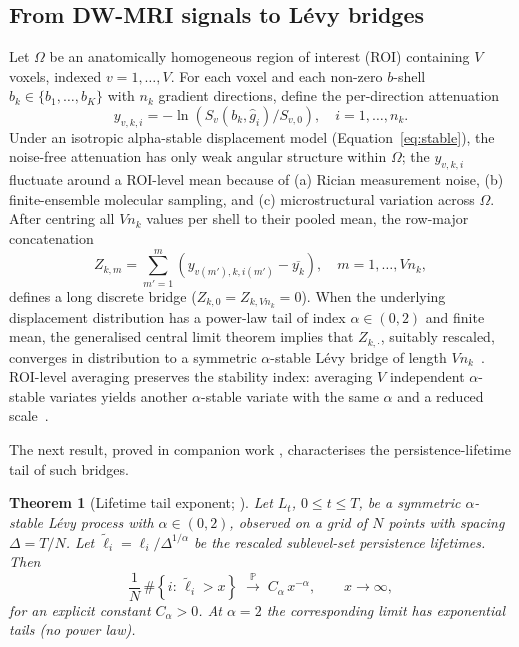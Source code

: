 \documentclass[11pt,letterpaper]{article}
\newcommand{\Prob}{\mathbb{P}}
\newcommand{\stab}{\alpha}
\newcommand{\life}{\ell}
\newtheorem{theorem}{Theorem}
\begin{document}
\subsection{From DW-MRI signals to L\'evy bridges}
Let $\Omega$ be an anatomically homogeneous region of interest (ROI)
containing $V$ voxels, indexed $v=1,\dots,V$. For each voxel and each
non-zero $b$-shell $b_k\in\{b_1,\dots,b_K\}$ with $n_k$ gradient
directions, define the per-direction attenuation
\begin{equation}
y_{v,k,i} = -\ln\!\left( S_v(b_k, \hat g_i)/S_{v,0} \right),
\quad i=1,\dots,n_k.
\label{eq:yk}
\end{equation}
Under an isotropic alpha-stable displacement model
(Equation~\ref{eq:stable}), the noise-free attenuation has only weak
angular structure within $\Omega$; the $y_{v,k,i}$ fluctuate around a
ROI-level mean because of (a) Rician measurement noise, (b)
finite-ensemble molecular sampling, and (c) microstructural variation
across $\Omega$. After centring all $V n_k$ values per shell to
their pooled mean, the row-major concatenation
\begin{equation}
Z_{k,m} = \sum_{m'=1}^{m}
\!\left( y_{v(m'),k,i(m')} - \overline{y_k} \right),
\quad m=1,\dots,V n_k,
\label{eq:Z}
\end{equation}
defines a long discrete bridge ($Z_{k,0}=Z_{k,Vn_k}=0$). When the
underlying displacement distribution has a power-law tail of index
$\stab \in (0,2)$ and finite mean, the generalised central limit
theorem implies that $Z_{k,\cdot}$, suitably rescaled, converges in
distribution to a symmetric $\stab$-stable L\'evy bridge of length
$Vn_k$~\citep{bertoin1996levy}. ROI-level averaging preserves the
stability index: averaging $V$ independent $\stab$-stable variates
yields another $\stab$-stable variate with the same $\stab$ and a
reduced scale~\citep{samorodnitsky1994stable}.

The next result, proved in companion work
\citep{warioba2026levy}, characterises the persistence-lifetime tail of
such bridges.

\begin{theorem}[Lifetime tail exponent; \citealt{warioba2026levy}]
\label{thm:tail}
Let $L_t$, $0\le t\le T$, be a symmetric $\stab$-stable L\'evy process
with $\stab\in(0,2)$, observed on a grid of $N$ points with spacing
$\Delta=T/N$. Let
$\widetilde{\life}_i = \life_i / \Delta^{1/\stab}$ be the rescaled
sublevel-set persistence lifetimes. Then
\begin{equation}
\frac{1}{N}\,\#\!\left\{ i:\, \widetilde{\life}_i > x \right\}
\;\xrightarrow{\;\Prob\;}\; C_{\stab}\, x^{-\stab},
\qquad x\to\infty,
\label{eq:tail}
\end{equation}
for an explicit constant $C_{\stab}>0$. At $\stab=2$ the corresponding
limit has exponential tails (no power law).
\end{theorem}
\end{document}
